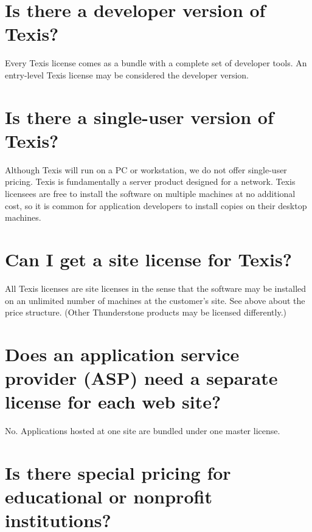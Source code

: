 \section{Is there a developer version of Texis? }

Every Texis license comes as a bundle with a complete set of developer
tools.  An entry-level Texis license may be considered the developer
version.

\section{Is there a single-user version of Texis? }

Although Texis will run on a PC or workstation, we do not offer
single-user pricing.  Texis is fundamentally a server product designed
for a network.  Texis licensees are free to install the software on
multiple machines at no additional cost, so it is common for
application developers to install copies on their desktop machines.

\section{Can I get a site license for Texis? }

All Texis licenses are site licenses in the sense that the software
may be installed on an unlimited number of machines at the customer's
site. See above about the price structure.  (Other Thunderstone
products may be licensed differently.)

\section{Does an application service provider (ASP) need a separate license for each web site? }

No.  Applications hosted at one site are bundled under one master
license.

\section{Is there special pricing for educational or nonprofit institutions? }

